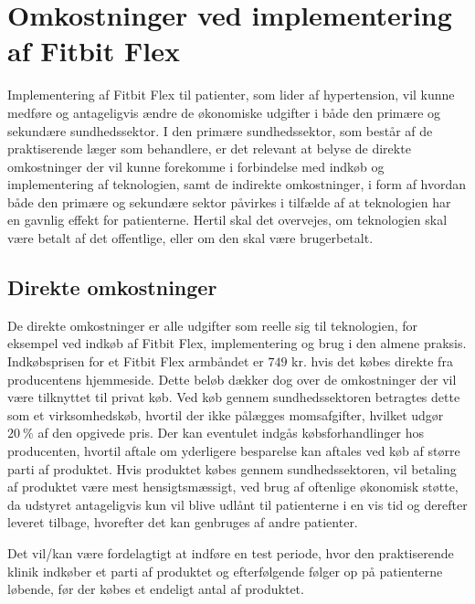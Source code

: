 
\section{Omkostninger ved implementering af Fitbit Flex} \label{sec:armbaand_omkost}


Implementering af Fitbit Flex til patienter, som lider af hypertension, vil kunne medføre og antageligvis ændre de økonomiske udgifter i både den primære og sekundære sundhedssektor. I den primære sundhedssektor, som består af de praktiserende læger som behandlere, er det relevant at belyse de direkte omkostninger der vil kunne forekomme i forbindelse med indkøb og implementering af teknologien, samt de indirekte omkostninger, i form af hvordan både den primære og sekundære sektor påvirkes i tilfælde af at teknologien har en gavnlig effekt for patienterne. Hertil skal det overvejes, om teknologien skal være betalt af det offentlige, eller om den skal være brugerbetalt. 

\subsection{Direkte omkostninger}
De direkte omkostninger er alle  udgifter som reelle sig til teknologien, for eksempel ved indkøb af Fitbit Flex, implementering og brug i den almene praksis.  
Indkøbsprisen for et Fitbit Flex armbåndet er $749$ kr. hvis det købes direkte fra producentens hjemmeside. Dette beløb dækker dog over de omkostninger der vil være tilknyttet til privat køb. 
Ved køb gennem sundhedssektoren betragtes dette som et virksomhedskøb, hvortil der ikke pålægges momsafgifter, hvilket udgør $20~\%$ af den opgivede pris. 
Der kan eventulet indgås købsforhandlinger hos producenten, hvortil aftale om yderligere besparelse kan aftales ved køb af større parti af produktet. Hvis produktet købes gennem sundhedssektoren, vil betaling af produktet være mest hensigtsmæssigt, ved brug af oftenlige økonomisk støtte, da udstyret antageligvis kun vil blive udlånt til patienterne i en vis tid og derefter leveret tilbage, hvorefter det kan genbruges af andre patienter. 

Det vil/kan være fordelagtigt at indføre en test periode, hvor den praktiserende klinik indkøber et parti af produktet og efterfølgende følger op på patienterne løbende, før der købes et endeligt antal af produktet. 
                 

